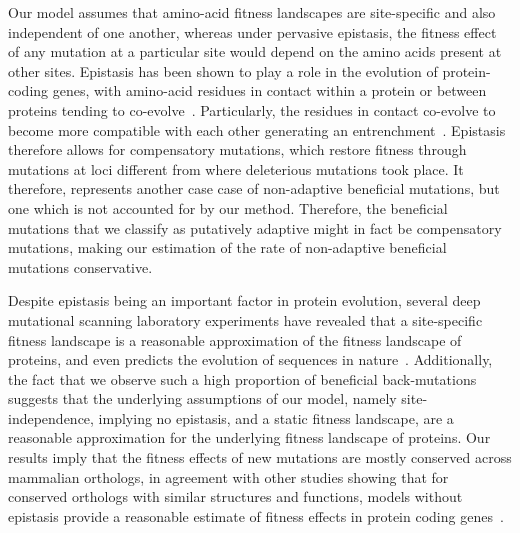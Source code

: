 \documentclass[9pt,twocolumn,twoside,lineno]{pnas-new}
\begin{document}
Our model assumes that amino-acid fitness landscapes are site-specific and also independent of one another, whereas under pervasive epistasis, the fitness effect of any mutation at a particular site would depend on the amino acids present at other sites.
Epistasis has been shown to play a role in the evolution of protein-coding genes, with amino-acid residues in contact within a protein or between proteins tending to co-evolve~\cite{morcos_directcoupling_2011, marks_protein_2012, starr_epistasis_2016}.
Particularly, the residues in contact co-evolve to become more compatible with each other generating an entrenchment~\cite{goldstein_nonadaptive_2015, goldstein_sequence_2017, park_epistatic_2022}.
Epistasis therefore allows for compensatory mutations, which restore fitness through mutations at loci different from where deleterious mutations took place.
It therefore, represents another case case of non-adaptive beneficial mutations, but one which is not accounted for by our method.
Therefore, the beneficial mutations that we classify as putatively adaptive might in fact be compensatory mutations, making our estimation of the rate of non-adaptive beneficial mutations conservative.

Despite epistasis being an important factor in protein evolution, several deep mutational scanning laboratory experiments have revealed that a site-specific fitness landscape is a reasonable approximation of the fitness landscape of proteins, and even predicts the evolution of sequences in nature~\cite{ashenberg_mutational_2013, doud_sitespecific_2015, bloom_identification_2017}.
Additionally, the fact that we observe such a high proportion of beneficial back-mutations suggests that the underlying assumptions of our model, namely site-independence, implying no epistasis, and a static fitness landscape, are a reasonable approximation for the underlying fitness landscape of proteins.
Our results imply that the fitness effects of new mutations are mostly conserved across mammalian orthologs, in agreement with other studies showing that for conserved orthologs with similar structures and functions, models without epistasis provide a reasonable estimate of fitness effects in protein coding genes~\cite{youssef_consequences_2020, vigue_deciphering_2022}.
\end{document}
